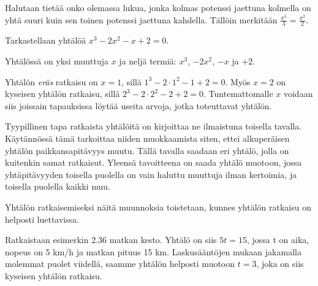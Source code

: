 \begin{esimerkki}
	Halutaan tietää onko olemassa lukua, jonka kolmas potenssi jaettuna kolmella on yhtä suuri kuin sen toinen potenssi jaettuna kahdella. Tällöin merkitään $\frac{x^3}{3}=\frac{x^2}{2}$. 
\end{esimerkki}


\begin{esimerkki}
 Tarkastellaan yhtälöä $x^3-2x^2-x+2=0$. 
 
 Yhtälössä on yksi muuttuja $x$ ja neljä termiä: $x^3$, $-2x^2$, $-x$ ja $+2$.  
 
 Yhtälön \textit{eräs} ratkaisu on $x=1$, sillä $1^3-2\cdot{1^2}-1+2=0$. 
 Myös $x=2$ on kyseisen yhtälön ratkaisu, sillä $2^3-2\cdot{2^2}-2+2=0$. 
 Tuntemattomalle $x$ voidaan siis joissain tapauksissa löytää useita arvoja, jotka toteuttavat yhtälön. 
\end{esimerkki}



Tyypillinen tapa ratkaista yhtälöitä on kirjoittaa ne ilmaistuna toisella tavalla.
Käytännössä tämä tarkoittaa niiden muokkaamista siten, ettei alkuperäisen yhtälön paikkansapitävyys muutu. Tällä tavalla saadaan eri yhtälö, jolla on kuitenkin samat ratkaisut.
Yleensä tavoitteena on saada yhtälö muotoon, jossa yhtäpitävyyden toisella puolella on vain haluttu muuttuja ilman kertoimia, ja toisella puolella kaikki muu. 

Yhtälön ratkaisemiseksi näitä muunnoksia toistetaan, kunnes yhtälön ratkaisu on helposti luettavissa.

\begin{esimerkki}
Ratkaistaan esimerkin 2.36 matkan kesto. Yhtälö on siis $5t=15$, jossa t on aika, nopeus on 5 km/h ja matkan pituus 15 km.
Laskusääntöjen mukaan jakamalla molemmat puolet viidellä, saamme yhtälön helposti muotoon $t=3$, joka on siis kyseisen yhtälön ratkaisu.

\end{esimerkki}



